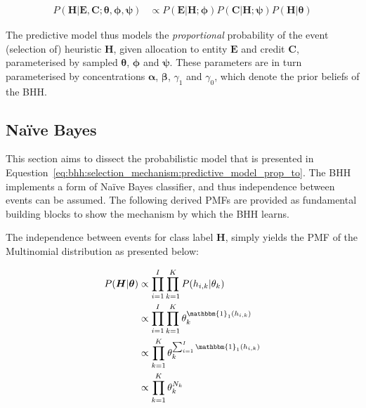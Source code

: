 \begin{equation}
      \label{eq:bhh:selection_mechanism:predictive_model_prop_to}
      \begin{split}
            P(\boldsymbol{H} \vert \boldsymbol{E}, \boldsymbol{C};  \boldsymbol{\theta}, \boldsymbol{\phi}, \boldsymbol{\psi}) &\propto P(\boldsymbol{E} \vert \boldsymbol{H};  \boldsymbol{\phi})  P(\boldsymbol{C} \vert \boldsymbol{H};  \boldsymbol{\psi}) P(\boldsymbol{H} \vert \boldsymbol{\theta})
      \end{split}
\end{equation}

The predictive model thus models the \textit{proportional} probability of the event (selection of) heuristic $\boldsymbol{H}$, given allocation to entity $\boldsymbol{E}$ and credit $\boldsymbol{C}$, parameterised by sampled $\boldsymbol{\theta}$, $\boldsymbol{\phi}$ and $\boldsymbol{\psi}$. These parameters are in turn parameterised by concentrations $\boldsymbol{\alpha}$, $\boldsymbol{\beta}$, $\gamma_{1}$ and $\gamma_{0}$, which denote the prior beliefs of the \acs{BHH}.


\subsection{Naïve Bayes}\label{sec:bhh:selection_mechanism:naive_bayes}

This section aims to dissect the probabilistic model that is presented in Equestion~\eqref{eq:bhh:selection_mechanism:predictive_model_prop_to}. The \acs{BHH} implements a form of Naïve Bayes classifier, and thus independence between events can be assumed. The following derived \acp{PMF} are provided as fundamental building blocks to show the mechanism by which the \acs{BHH} learns.

The independence between events for class label $\boldsymbol{H}$, simply yields the \ac{PMF} of the Multinomial distribution as presented below:

\begin{equation}
      \label{eq:bhh:selection_mechanism:naive_bayes:h_pmf}
      \begin{split}
            P(\boldsymbol{H} \vert \boldsymbol{\theta})
            &\propto \prod_{i=1}^{I} \prod_{k=1}^{K} P(h_{i,k} \vert \theta_{k}) \\
            &\propto \prod_{i=1}^{I} \prod_{k=1}^{K} \theta_{k}^{\mathbbm{1}_{1}(h_{i,k})} \\
            &\propto \prod_{k=1}^{K} \theta_{k}^{\sum_{i=1}^{I} \mathbbm{1}_{1}(h_{i,k})} \\
            &\propto \prod_{k=1}^{K} \theta_{k}^{N_{k}}
      \end{split}
\end{equation}

